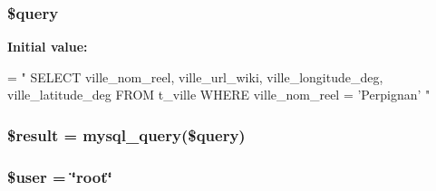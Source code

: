 \hypertarget{index_8php_af59a5f7cd609e592c41dc3643efd3c98}{
\subsubsection[{\$query}]{\setlength{\rightskip}{0pt plus 5cm}\$query}}\label{index_8php_af59a5f7cd609e592c41dc3643efd3c98}
{\bfseries Initial value\-:}
\begin{DoxyCode}
= \textcolor{stringliteral}{"}
\textcolor{stringliteral}{    SELECT ville\_nom\_reel, ville\_url\_wiki, ville\_longitude\_deg, ville\_latitude\_deg}
\textcolor{stringliteral}{}
\textcolor{stringliteral}{    FROM t\_ville}
\textcolor{stringliteral}{}
\textcolor{stringliteral}{    WHERE ville\_nom\_reel = 'Perpignan'}
\textcolor{stringliteral}{"}
\end{DoxyCode}
\hypertarget{index_8php_a112ef069ddc0454086e3d1e6d8d55d07}{
\subsubsection[{\$result}]{\setlength{\rightskip}{0pt plus 5cm}\$result = mysql\-\_\-query(\$query)}}\label{index_8php_a112ef069ddc0454086e3d1e6d8d55d07}
\hypertarget{index_8php_a598ca4e71b15a1313ec95f0df1027ca5}{
\subsubsection[{\$user}]{\setlength{\rightskip}{0pt plus 5cm}\$user = \char`\"{}root\char`\"{}}}\label{index_8php_a598ca4e71b15a1313ec95f0df1027ca5}
